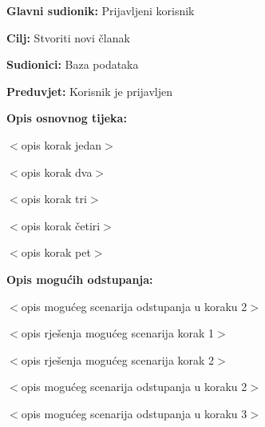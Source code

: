 \noindent {}
\begin{packed_item}

\item \textbf{Glavni sudionik:} Prijavljeni korisnik
\item  \textbf{Cilj:} Stvoriti novi članak
\item  \textbf{Sudionici:} Baza podataka
\item  \textbf{Preduvjet:} Korisnik je prijavljen
\item  \textbf{Opis osnovnog tijeka:}

\item[] \begin{packed_enum}

    \item $<$opis korak jedan$>$
    \item $<$opis korak dva$>$
    \item $<$opis korak tri$>$
    \item $<$opis korak četiri$>$
    \item $<$opis korak pet$>$

\end{packed_enum}

\item  \textbf{Opis mogućih odstupanja:}

\item[] \begin{packed_item}

    \item[2.a] $<$opis mogućeg scenarija odstupanja u koraku 2$>$

    \item[] \begin{packed_enum}

        \item $<$opis rješenja mogućeg scenarija korak 1$>$
        \item $<$opis rješenja mogućeg scenarija korak 2$>$

    \end{packed_enum}

\item[2.b] $<$opis mogućeg scenarija odstupanja u koraku 2$>$
\item[3.a] $<$opis mogućeg scenarija odstupanja  u koraku 3$>$

\end{packed_item}

\end{packed_item}

